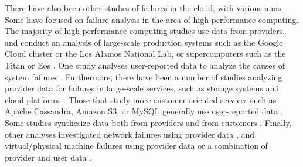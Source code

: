 There have also been other studies of failures in the cloud, with various aims.
Some have focused on failure analysis in the area of high-performance computing.
The majority of high-performance computing studies use data from providers, and conduct an analysis of large-scale production systems such as the Google Cloud cluster or the Los Alamos National Lab, or supercomputers such as the Titan or Eos \cite{chen2014, elsayed2017, liang2006, zheng2011, kavulya2010, gupta2015, gupta2017, di2019, elsayed2013, martino2014, schroeder2010, javadi2013, schroeder2007}.
One study analyses user-reported data to analyze the causes of system failures \cite{gray1986}.
Furthermore, there have been a number of studies analyzing provider data for failures in large-scale services, such as storage systems and cloud platforms \cite{oppenheimer2003, ford2010, schroeder2007, javadi2013, garraghan2014, yalagandula2004, li2013, zhou2015}.
Those that study more customer-oriented services such as Apache Cassandra, Amazon S3, or MySQL generally use user-reported data \cite{frattini2013, yuan2014, iosup2011, palankar2008, fonseca2010, fonseca2010, benson2010, jiang2008, yin2011}.
Some studies synthesize data both from providers and from customers \cite{ostermann2008, sahoo2010}.
Finally, other analyses investigated network failures using provider data \cite{gill2011, banerjee2015, turner2010}, and virtual/physical machine failures using provider data \cite{vishwanath2010, nightingale2011, rosa2015} or a combination of provider and user data \cite{birke2014}.
